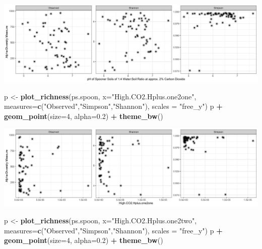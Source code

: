 \documentclass[]{article}
\newenvironment{Shaded}{\begin{snugshade}}{\end{snugshade}}
\newcommand{\DataTypeTok}[1]{\textcolor[rgb]{0.13,0.29,0.53}{#1}}
\newcommand{\DecValTok}[1]{\textcolor[rgb]{0.00,0.00,0.81}{#1}}
\newcommand{\FloatTok}[1]{\textcolor[rgb]{0.00,0.00,0.81}{#1}}
\newcommand{\KeywordTok}[1]{\textcolor[rgb]{0.13,0.29,0.53}{\textbf{#1}}}
\newcommand{\NormalTok}[1]{#1}
\newcommand{\OperatorTok}[1]{\textcolor[rgb]{0.81,0.36,0.00}{\textbf{#1}}}
\newcommand{\StringTok}[1]{\textcolor[rgb]{0.31,0.60,0.02}{#1}}
\begin{document}
\includegraphics{output-rmd/richness-ph-High.CO2.pH.one2four.spoon-1.png}

\begin{Shaded}
\begin{Highlighting}[]
\NormalTok{p <-}\StringTok{ }\KeywordTok{plot_richness}\NormalTok{(ps.spoon, }\DataTypeTok{x=}\StringTok{"High.CO2.Hplus.one2one"}\NormalTok{, }\DataTypeTok{measures=}\KeywordTok{c}\NormalTok{(}\StringTok{"Observed"}\NormalTok{,}\StringTok{"Simpson"}\NormalTok{,}\StringTok{"Shannon"}\NormalTok{), }\DataTypeTok{scales =} \StringTok{"free_y"}\NormalTok{)}
\NormalTok{p }\OperatorTok{+}\StringTok{ }\KeywordTok{geom_point}\NormalTok{(}\DataTypeTok{size=}\DecValTok{4}\NormalTok{, }\DataTypeTok{alpha=}\FloatTok{0.2}\NormalTok{) }\OperatorTok{+}\StringTok{ }\KeywordTok{theme_bw}\NormalTok{()}
\end{Highlighting}
\end{Shaded}

\includegraphics{output-rmd/richness-ph-High.CO2.Hplus.one2one.spoon-1.png}

\begin{Shaded}
\begin{Highlighting}[]
\NormalTok{p <-}\StringTok{ }\KeywordTok{plot_richness}\NormalTok{(ps.spoon, }\DataTypeTok{x=}\StringTok{"High.CO2.Hplus.one2two"}\NormalTok{, }\DataTypeTok{measures=}\KeywordTok{c}\NormalTok{(}\StringTok{"Observed"}\NormalTok{,}\StringTok{"Simpson"}\NormalTok{,}\StringTok{"Shannon"}\NormalTok{), }\DataTypeTok{scales =} \StringTok{"free_y"}\NormalTok{)}
\NormalTok{p }\OperatorTok{+}\StringTok{ }\KeywordTok{geom_point}\NormalTok{(}\DataTypeTok{size=}\DecValTok{4}\NormalTok{, }\DataTypeTok{alpha=}\FloatTok{0.2}\NormalTok{) }\OperatorTok{+}\StringTok{ }\KeywordTok{theme_bw}\NormalTok{()}
\end{Highlighting}
\end{Shaded}
\end{document}
